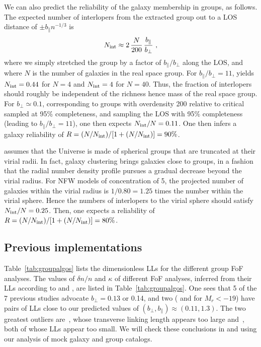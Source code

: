 We can also predict the reliability of the galaxy membership in groups, as
follows. The expected number of interlopers from the extracted group out to a
LOS distance of $\pm b_\parallel n^{-1/3}$ is
%
\begin{equation}
    N_{\rm int} \approx 2\,{N\over 200} \,{b_\parallel\over b_\perp} \ ,
    \label{eq:Nilop}
\end{equation}
%
where we simply stretched the group by a factor of $b_\parallel/b_\perp$ along
the LOS, and where $N$ is the number of galaxies in the real space group. For
$b_\parallel/b_\perp=11$,  yields $N_{\rm int}= 0.44$
for $N=4$ and $N_{\rm int}=4$ for $N=40$. Thus, the fraction of interlopers
should roughly be independent of the richness hence mass of the real space
group. For $b_\perp \simeq 0.1$, corresponding to groups with overdensity 200
relative to critical sampled at 95\% completeness, and sampling the LOS with
95\% completeness (leading to $b_\parallel/b_\perp=11$), one then expects
$N_{\rm int}/N = 0.11$. One then infers a galaxy reliability of $R=(N/N_{\rm
int})/[1+(N/N_{\rm int})] = 90\%$.

 assumes that the Universe is made of spherical groups
that are truncated at their virial radii. In fact, galaxy clustering brings
galaxies close to groups, in a fashion that the radial number density profile
pursues a gradual decrease beyond the virial radius. For NFW models of
concentration of 5, the projected number of galaxies within the virial radius
is $1/0.80 = 1.25$ times the number within the virial sphere. Hence the numbers
of interlopers to the virial sphere should satisfy $N_{\rm int}/N=0.25$. Then,
one expects a reliability of $R=(N/N_{\rm int})/[1+(N/N_{\rm int})] = 80\%$.

\subsection{Previous implementations}

Table~\ref{tab:groupalgos} lists the dimensionless LLs for the different group
FoF analyses. The values of $\delta n/n$ and $\kappa$ of different FoF
analyses, inferred from their LLs according to 
and , are listed in Table~\ref{tab:groupalgos}.
One sees that 5 of the 7 previous studies advocate $b_\perp = 0.13$ or 0.14,
and two (\citealp{Eke+04} and \citealp{Tempel+14} for $M_r < -19$) have pairs
of LLs close to our predicted values of $(b_\perp,b_\parallel)\approx
(0.11,1.3)$. The two greatest outliers are~\cite{HG82}, whose transverse
linking length appears too large and~\cite{Robotham+11}, both of whose LLs
appear too small. We will check these conclusions in 
and  using our analysis of mock galaxy and group
catalogs.

